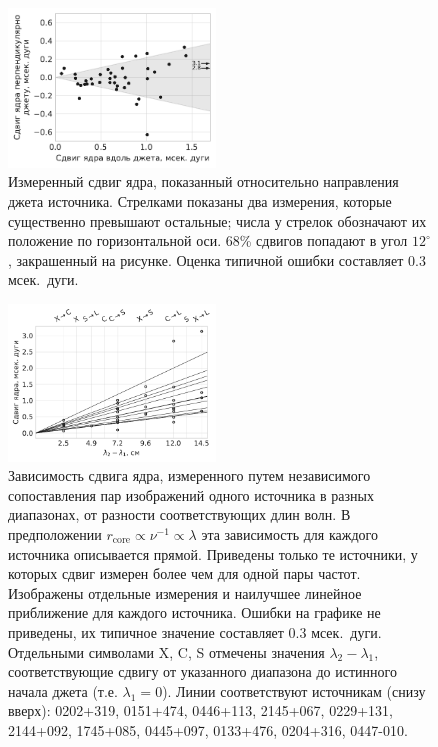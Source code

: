 \begin{figure}
 \centering
 \includegraphics[width=0.49\textwidth]{cs_alignment}
 \caption{Измеренный сдвиг ядра, показанный относительно направления джета источника. Стрелками
показаны два измерения, которые существенно превышают остальные; числа у стрелок обозначают их
положение по горизонтальной оси. 68\% сдвигов попадают в угол $12^\circ$, закрашенный на рисунке.
Оценка типичной ошибки составляет 0.3 мсек.~дуги.}
 \label{fig:cs_alignment}
\end{figure}

\begin{figure}
 \centering
 \includegraphics[width=0.49\textwidth]{cs_freqdep}
 \caption{ Зависимость сдвига ядра, измеренного путем независимого сопоставления пар
изображений одного источника в разных диапазонах, от разности соответствующих длин волн. В
предположении $r_\text{core} \propto \nu^{-1} \propto \lambda$ эта зависимость для каждого
источника описывается прямой. Приведены только те источники, у которых сдвиг измерен более чем для
одной пары частот. Изображены отдельные измерения и наилучшее линейное приближение для каждого
источника. Ошибки на графике не приведены, их типичное значение составляет 0.3 мсек.~дуги.
Отдельными символами X, C, S отмечены значения $\lambda_2 - \lambda_1$, соответствующие сдвигу от
указанного диапазона до истинного начала джета (т.е. $\lambda_1 = 0$).  Линии соответствуют
источникам (снизу вверх): 0202+319, 0151+474, 0446+113, 2145+067, 0229+131, 2144+092, 1745+085,
0445+097, 0133+476, 0204+316, 0447-010.
 }
 \label{fig:cs_freqdep}
\end{figure}

